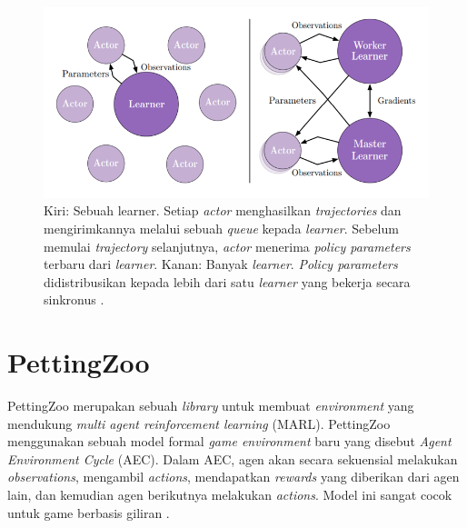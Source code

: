 \begin{figure}[H]
  \centering
    \includegraphics[scale=0.8]{gambar/impala_worker.png}
    \caption{Kiri: Sebuah learner. Setiap \emph{actor} menghasilkan \emph{trajectories} dan mengirimkannya melalui sebuah \emph{queue} kepada \emph{learner}.
    Sebelum memulai \emph{trajectory} selanjutnya, \emph{actor} menerima \emph{policy parameters} terbaru dari \emph{learner}.
    Kanan: Banyak \emph{learner}. \emph{Policy parameters} didistribusikan kepada lebih dari satu \emph{learner} yang bekerja secara sinkronus \citep{impala}.}
    \label{fig:impalaSingleVsMultipleLearner}
\end{figure}

\section{PettingZoo}

PettingZoo merupakan sebuah \emph{library} untuk membuat \emph{environment} yang mendukung \emph{multi agent reinforcement learning} (MARL).
PettingZoo menggunakan sebuah model formal \emph{game environment} baru yang disebut \emph{Agent Environment Cycle} (AEC). Dalam AEC, agen akan secara sekuensial melakukan \emph{observations}, mengambil \emph{actions}, mendapatkan \emph{rewards} yang diberikan dari agen lain, dan kemudian agen berikutnya melakukan \emph{actions}.
Model ini sangat cocok untuk game berbasis giliran \citep{pettingZoo}.

